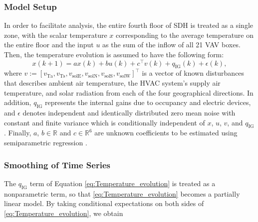 \subsubsection{Model Setup}
In order to facilitate analysis, the entire fourth floor of SDH is treated as a single zone, with the scalar temperature $x$ corresponding to the %
average temperature on the entire floor and the input $u$ as the sum of the inflow of all 21 VAV boxes. %
Then, the temperature evolution is assumed to have the following form:
\begin{equation}\label{eq:Temperature_evolution}
x(k+1) = a x(k) + b u(k) + c^\top v(k) + q_{\text{IG}}(k) + \epsilon(k),
\end{equation}
where %
$v := \left[v_\text{Ta}, v_\text{Ts}, v_\text{solE}, v_\text{solN}, v_\text{solS}, v_\text{solW} \right]^\top$ is a vector of known disturbances that describes ambient air temperature, the HVAC system's supply air temperature, and solar radiation from each of the four geographical directions.
In addition, $q_{\text{IG}}$ represents the internal gains due to occupancy and electric devices, and $\epsilon$ denotes independent and identically distributed zero mean noise with constant and finite variance which is conditionally independent of $x$, $u$, $v$, and $q_{\text{IG}}$. Finally, $a$, $b \in \mathbb{R}$ and $c \in \mathbb{R}^6$ are unknown coefficients to be estimated using semiparametric regression \cite{Ruppert:2003aa, Hardle:2000aa}.

\subsubsection{Smoothing of Time Series}
The $q_{\text{IG}}$ term of Equation \eqref{eq:Temperature_evolution} is treated as a nonparametric term, so that \eqref{eq:Temperature_evolution} becomes a partially linear model. By taking conditional expectations on both sides of \eqref{eq:Temperature_evolution}, we obtain


